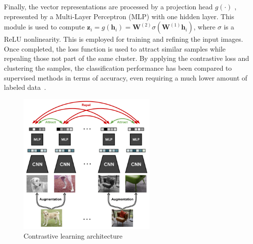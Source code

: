 \documentclass[12pt]{article}
\begin{document}
Finally, the vector representations are processed by a projection head $g(\cdot)$ , represented by a Multi-Layer Perceptron (MLP) with one hidden layer. This module is used to compute $\boldsymbol{z}_i = g(\boldsymbol{h}_i) = \boldsymbol{W}^{(2)}\sigma(\boldsymbol{W}^{(1)}\boldsymbol{h}_i)$, where $\sigma$ is a ReLU nonlinearity. This is employed for training and refining the input images. Once completed, the loss function is used to attract similar samples while repealing those not part of the same cluster. By applying the contrastive loss and clustering the samples, the classification performance has been compared to supervised methods in terms of accuracy, even requiring a much lower amount of labeled data~\citep{chen2020}.

\begin{figure}[ht]
\centering
\includegraphics[height=7cm]{res/contrastive_learning}
\caption{\label{figure:contrastive_learning}Contrastive learning architecture~\citep{ashish2020}}
\end{figure}
\end{document}
